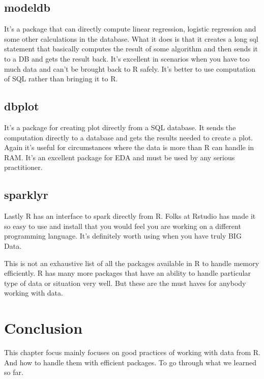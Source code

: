 \documentclass[
]{book}
\begin{document}
\hypertarget{modeldb}{%
\subsection{modeldb}\label{modeldb}}

It's a package that can directly compute linear regression, logistic regression and some other calculations in the database. What it does is that it creates a long sql statement that basically computes the result of some algorithm and then sends it to a DB and gets the result back. It's excellent in scenarios when you have too much data and can't be brought back to R safely. It's better to use computation of SQL rather than bringing it to R.

\hypertarget{dbplot}{%
\subsection{dbplot}\label{dbplot}}

It's a package for creating plot directly from a SQL database. It sends the computation directly to a database and gets the results needed to create a plot. Again it's useful for circumstances where the data is more than R can handle in RAM. It's an excellent package for EDA and must be used by any serious practitioner.

\hypertarget{sparklyr}{%
\subsection{sparklyr}\label{sparklyr}}

Lastly R has an interface to spark directly from R. Folks at Rstudio has made it so easy to use and install that you would feel you are working on a different programming language. It's definitely worth using when you have truly BIG Data.

This is not an exhaustive list of all the packages available in R to handle memory efficiently. R has many more packages that have an ability to handle particular type of data or situation very well. But these are the must haves for anybody working with data.

\hypertarget{conclusion-4}{%
\section{Conclusion}\label{conclusion-4}}

This chapter focus mainly focuses on good practices of working with data from R. And how to handle them with efficient packages. To go through what we learned so far.
\end{document}
